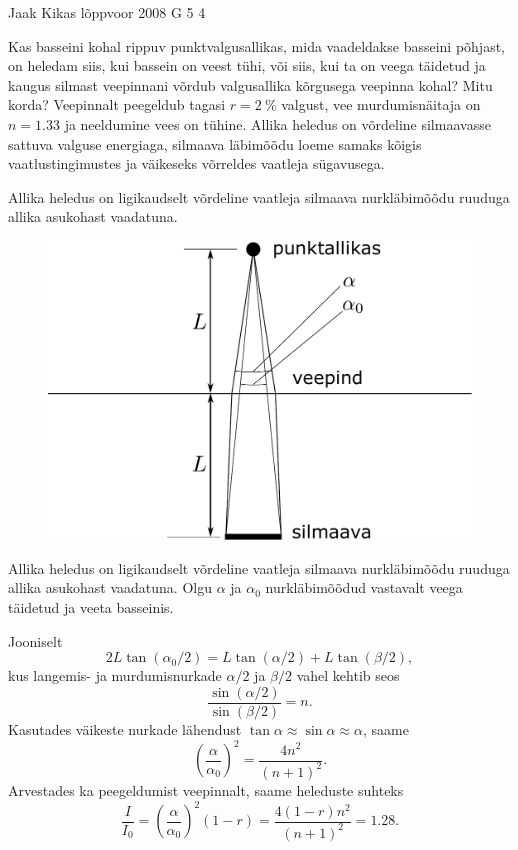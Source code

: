 {Jaak Kikas} %
{lõppvoor} %
{2008} %
{G 5} %
{4} %
{
\ifStatement
Kas basseini kohal rippuv punktvalgusallikas, mida vaadeldakse basseini põhjast, on heledam siis, kui bassein on veest tühi, või siis, kui ta on veega täidetud ja kaugus silmast veepinnani võrdub valgusallika kõrgusega veepinna kohal? Mitu korda? Veepinnalt peegeldub tagasi $r = \SI{2}{\%}$ valgust, vee murdumisnäitaja on $n = \num{1,33}$ ja neeldumine vees on tühine. Allika heledus on võrdeline silmaavasse sattuva valguse energiaga, silmaava läbimõõdu loeme samaks kõigis vaatlustingimustes ja väikeseks võrreldes vaatleja sügavusega.
\fi


\ifHint
Allika heledus on ligikaudselt võrdeline vaatleja silmaava nurkläbimõõdu ruuduga allika asukohast vaadatuna.
\fi


\ifSolution
\begin{figure}
	\begin{center}
		\includegraphics[width=0.95\linewidth]{2008-v3g-05-lah}
	\end{center}
\end{figure}
Allika heledus on ligikaudselt võrdeline vaatleja silmaava nurkläbimõõdu ruuduga allika asukohast vaadatuna. Olgu $\alpha$ ja $\alpha_0$ nurkläbimõõdud vastavalt veega täidetud ja veeta basseinis.

Jooniselt
\[
2L\tan (\alpha_0 /2) = L\tan (\alpha /2) + L\tan (\beta /2),
\]
kus langemis- ja murdumisnurkade $\alpha /2$ ja $\beta /2$ vahel kehtib seos
\[
\frac{\sin(\alpha/2)}{\sin(\beta/2)} = n.
\]
Kasutades väikeste nurkade lähendust $\tan\alpha\approx\sin\alpha\approx\alpha$, saame 
\[
\left(\frac{\alpha}{\alpha_0}\right)^2 = \frac{4n^2}{(n+1)^2}.
\]
Arvestades ka peegeldumist veepinnalt, saame heleduste suhteks
\[
\frac{I}{I_{0}}=\left(\frac{\alpha}{\alpha_0}\right)^2(1-r) = \frac{4(1-r) n^{2}}{(n+1)^{2}}=\num{1,28}.
\]
\fi
}